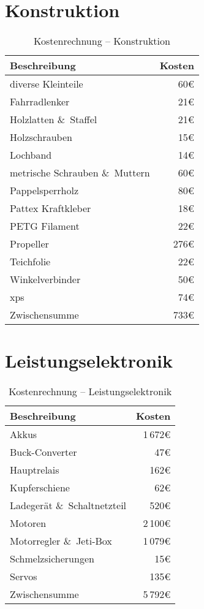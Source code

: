 \section{Konstruktion}
\begin{table}[H]
    \centering
    \begin{tabular}{|l|r|}
        \hline
        \textbf{Beschreibung} & \textbf{Kosten}\\\hline
        diverse Kleinteile & 60\euro\\
        Fahrradlenker & 21\euro\\
        Holzlatten \&\ Staffel & 21\euro\\
        Holzschrauben & 15\euro\\
        Lochband & 14\euro\\
        metrische Schrauben \&\ Muttern & 60\euro\\
        Pappelsperrholz & 80\euro\\
        Pattex Kraftkleber & 18\euro\\
        PETG Filament & 22\euro\\
        Propeller & 276\euro\\
        Teichfolie & 22\euro\\
        Winkelverbinder & 50\euro\\
        \acs{xps} & 74\euro\\        
        \hline
        Zwischensumme & 733\euro\\\hline
    \end{tabular}
    \caption{Kostenrechnung -- Konstruktion}
\end{table}

\section{Leistungselektronik}
\begin{table}[H]
    \centering
    \begin{tabular}{|l|r|}
        \hline
        \textbf{Beschreibung} & \textbf{Kosten}\\\hline
        Akkus & 1\,672\euro\\
        Buck-Converter & 47\euro\\
        Hauptrelais & 162\euro\\
        Kupferschiene & 62\euro\\
        Ladegerät \&\ Schaltnetzteil & 520\euro\\
        Motoren & 2\,100\euro\\
        Motorregler \&\ Jeti-Box & 1\,079\euro\\
        Schmelzsicherungen & 15\euro\\
        Servos & 135\euro\\
        \hline
        Zwischensumme & 5\,792\euro\\\hline
    \end{tabular}
    \caption{Kostenrechnung -- Leistungselektronik}
\end{table}

